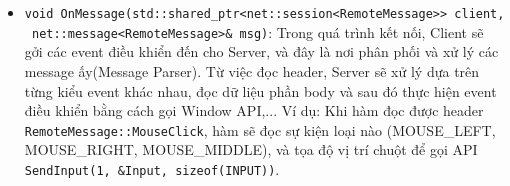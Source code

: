 \begin{itemize}
\begin{itemize}
		\item[] \lstinline{void OnMessage(std::shared_ptr<net::session<RemoteMessage>> client,}\\ \lstinline{ net::message<RemoteMessage>& msg)}: Trong quá trình kết nối, Client sẽ gởi các event điều khiển đến cho Server, và đây là nơi phân phối và xử lý các message ấy(Message Parser). Từ việc đọc header, Server sẽ xử lý dựa trên từng kiểu event khác nhau, đọc dữ liệu phần body và sau đó thực hiện event điều khiển bằng cách gọi Window API,... Ví dụ: Khi hàm đọc được header \lstinline{RemoteMessage::MouseClick}, hàm sẽ đọc sự kiện loại nào (MOUSE\_LEFT, MOUSE\_RIGHT, MOUSE\_MIDDLE), và tọa độ vị trí chuột để gọi API \lstinline{SendInput(1, &Input, sizeof(INPUT))}.
	\end{itemize}
\end{itemize}


